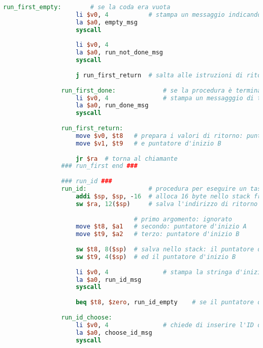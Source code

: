 \begin{center}
\begin{lstlisting}[language=mips, gobble=14, stepnumber=1]
                run_first_empty:		# se la coda era vuota
                    li $v0, 4			# stampa un messaggio indicando l'errore
                    la $a0, empty_msg
                    syscall
                    
                    li $v0, 4
                    la $a0, run_not_done_msg
                    syscall
                    
                    j run_first_return	# salta alle istruzioni di ritorno
                
                run_first_done:				# se la procedura è terminata con successo
                    li $v0, 4				# stampa un messagggio di terminazione
                    la $a0, run_done_msg
                    syscall
                    
                run_first_return:
                    move $v0, $t8	# prepara i valori di ritorno: puntatore d'inizio A
                    move $v1, $t9	# e puntatore d'inizio B
                
                    jr $ra	# torna al chiamante
                ### run_first end ###
                
                ### run_id ###
                run_id:					# procedura per eseguire un task specifico
                    addi $sp, $sp, -16	# alloca 16 byte nello stack frame (4 word)
                    sw $ra, 12($sp)		# salva l'indirizzo di ritorno nello stack
                
                					# primo argomento: ignorato
                    move $t8, $a1	# secondo: puntatore d'inizio A
                    move $t9, $a2	# terzo: puntatore d'inizio B
                    
                    sw $t8, 8($sp)	# salva nello stack: il puntatore d'inizio A
                    sw $t9, 4($sp)	# ed il puntatore d'inizio B
                
                    li $v0, 4               # stampa la stringa d'inizio dell'esecuzione di un task specifico
                    la $a0, run_id_msg
                    syscall
                    
                    beq $t8, $zero, run_id_empty	# se il puntatore d'inizio è nullo, allora la coda è vuota
                    
                run_id_choose:
                    li $v0, 4				# chiede di inserire l'ID del task da eseguire
                    la $a0, choose_id_msg
                    syscall
                    

\end{lstlisting}
\end{center}
